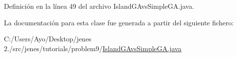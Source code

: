 Definición en la línea 49 del archivo Island\-G\-Avs\-Simple\-G\-A.\-java.



La documentación para esta clase fue generada a partir del siguiente fichero\-:\begin{DoxyCompactItemize}
\item 
C\-:/\-Users/\-Ayo/\-Desktop/jenes 2./src/jenes/tutorials/problem9/\hyperlink{_island_g_avs_simple_g_a_8java}{Island\-G\-Avs\-Simple\-G\-A.\-java}\end{DoxyCompactItemize}
